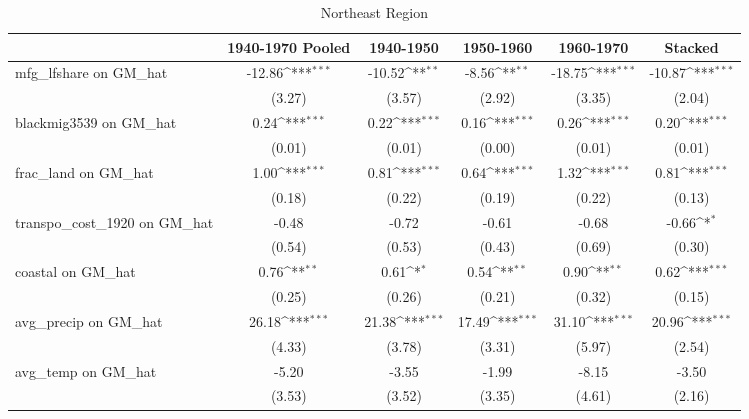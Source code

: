 \begin{table}[htbp]\centering
\def\sym#1{\ifmmode^{#1}\else\(^{#1}\)\fi}
\caption{Northeast Region}
\begin{tabular}{l*{5}{c}}
\toprule
                &\multicolumn{1}{c}{1940-1970 Pooled}&\multicolumn{1}{c}{1940-1950}&\multicolumn{1}{c}{1950-1960}&\multicolumn{1}{c}{1960-1970}&\multicolumn{1}{c}{Stacked}\\
\midrule
mfg\_lfshare on GM\_hat&   -12.86\sym{***}&   -10.52\sym{**} &    -8.56\sym{**} &   -18.75\sym{***}&   -10.87\sym{***}\\
                &   (3.27)         &   (3.57)         &   (2.92)         &   (3.35)         &   (2.04)         \\
\addlinespace
blackmig3539 on GM\_hat&     0.24\sym{***}&     0.22\sym{***}&     0.16\sym{***}&     0.26\sym{***}&     0.20\sym{***}\\
                &   (0.01)         &   (0.01)         &   (0.00)         &   (0.01)         &   (0.01)         \\
\addlinespace
frac\_land on GM\_hat&     1.00\sym{***}&     0.81\sym{***}&     0.64\sym{***}&     1.32\sym{***}&     0.81\sym{***}\\
                &   (0.18)         &   (0.22)         &   (0.19)         &   (0.22)         &   (0.13)         \\
\addlinespace
transpo\_cost\_1920 on GM\_hat&    -0.48         &    -0.72         &    -0.61         &    -0.68         &    -0.66\sym{*}  \\
                &   (0.54)         &   (0.53)         &   (0.43)         &   (0.69)         &   (0.30)         \\
\addlinespace
coastal on GM\_hat&     0.76\sym{**} &     0.61\sym{*}  &     0.54\sym{**} &     0.90\sym{**} &     0.62\sym{***}\\
                &   (0.25)         &   (0.26)         &   (0.21)         &   (0.32)         &   (0.15)         \\
\addlinespace
avg\_precip on GM\_hat&    26.18\sym{***}&    21.38\sym{***}&    17.49\sym{***}&    31.10\sym{***}&    20.96\sym{***}\\
                &   (4.33)         &   (3.78)         &   (3.31)         &   (5.97)         &   (2.54)         \\
\addlinespace
avg\_temp on GM\_hat&    -5.20         &    -3.55         &    -1.99         &    -8.15         &    -3.50         \\
                &   (3.53)         &   (3.52)         &   (3.35)         &   (4.61)         &   (2.16)         \\

\end{tabular}
\end{table}
